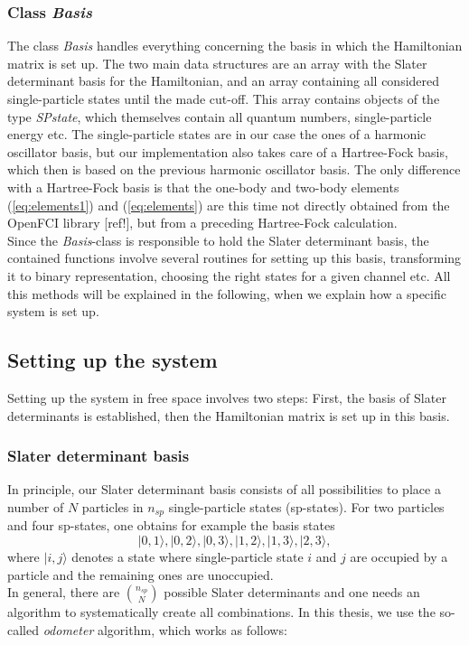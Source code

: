 \subsubsection{Class \textit{Basis}}
The class \textit{Basis} handles everything concerning the basis in which the Hamiltonian matrix is set up. The two main data structures are an array with the Slater determinant basis for the Hamiltonian, and an array containing all considered single-particle states until the made cut-off. This array contains objects of the type \textit{SPstate}, which themselves contain all quantum numbers, single-particle energy etc. The single-particle states are in our case the ones of a harmonic oscillator basis, but our implementation also takes care of a Hartree-Fock basis, which then is based on the previous harmonic oscillator basis. The only difference with a Hartree-Fock basis is that the one-body and two-body elements (\ref{eq:elements1}) and (\ref{eq:elements}) are this time not directly obtained from the OpenFCI library [ref!], but from a preceding Hartree-Fock calculation.\\
Since the \textit{Basis}-class is responsible to hold the Slater determinant basis, the contained functions involve several routines for setting up this basis, transforming it to binary representation, choosing the right states for a given channel etc. All this methods will be explained in the following, when we explain how a specific system is set up.

\subsection{Setting up the system}

Setting up the system in free space involves two steps: First, the basis of Slater determinants is established, then the Hamiltonian matrix is set up in this basis.

\subsubsection{Slater determinant basis}
In principle, our Slater determinant basis consists of all possibilities to place a number of $N$ particles in $n_{sp}$ single-particle states (sp-states). For two particles and four sp-states, one obtains for example the basis states
\[
|0,1\rangle, |0,2\rangle, |0,3\rangle, |1,2\rangle, |1,3\rangle, |2,3\rangle,
\]
where $|i,j\rangle$ denotes a state where single-particle state $i$ and $j$ are occupied by a particle and the remaining ones are unoccupied.\\
In general, there are $\binom{n_{sp}}{N}$ possible Slater determinants and one needs an algorithm to systematically create all combinations. In this thesis, we use the so-called \textit{odometer} algorithm, which works as follows:

